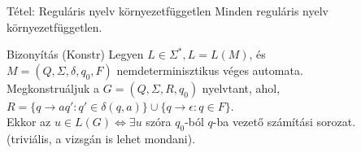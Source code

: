 \documentclass{beamer}
\begin{document}
\begin{frame}
\begin{block}{Tétel: Reguláris nyelv környezetfüggetlen}
Minden reguláris nyelv környezetfüggetlen.
\end{block}

\begin{block}{Bizonyítás (Konstr)}
Legyen $L \in {\Sigma}^*, L = L(M)$, és\\
$M = (Q, {\Sigma}, {\delta}, q_0, F)$ nemdeterminisztikus véges automata.\\
\bigskip
Megkonstruáljuk a $G = (Q, {\Sigma}, R, q_0)$ nyelvtant, ahol,\\
$R = \{q \rightarrow aq' : q' \in {\delta}(q, a)\} \cup \{q \rightarrow \epsilon : q \in F \}$.\\
Ekkor az $u \in  L(G) \iff \exists u$ szóra $q_0$-ból $q$-ba vezető számítási sorozat.\\
(triviális, a vizsgán is lehet mondani).
\end{block}

\end{frame}
\end{document}
